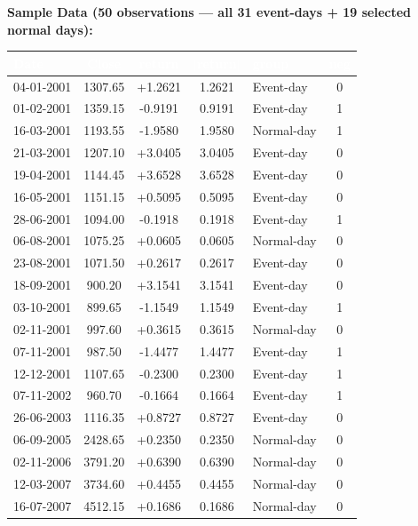 \documentclass[12pt,a4paper]{article}
\begin{document}
\textbf{Sample Data (50 observations --- all 31 event-days + 19 selected normal days):}
\begin{table}[H]
\centering
\footnotesize
\begin{tabular}{|l|c|c|c|l|c|}
\hline
\rowcolor{hdrbg}\textcolor{white}{\textbf{Date}} & \textcolor{white}{\textbf{Close}} & \textcolor{white}{\textbf{return}} & \textcolor{white}{\textbf{$|$return$|$}} & \textcolor{white}{\textbf{group}} & \textcolor{white}{\textbf{neg}} \\
\hline
04-01-2001 & 1307.65 & +1.2621 & 1.2621 & Event-day & 0 \\ \hline
01-02-2001 & 1359.15 & -0.9191 & 0.9191 & Event-day & 1 \\ \hline
16-03-2001 & 1193.55 & -1.9580 & 1.9580 & Normal-day & 1 \\ \hline
21-03-2001 & 1207.10 & +3.0405 & 3.0405 & Event-day & 0 \\ \hline
19-04-2001 & 1144.45 & +3.6528 & 3.6528 & Event-day & 0 \\ \hline
16-05-2001 & 1151.15 & +0.5095 & 0.5095 & Event-day & 0 \\ \hline
28-06-2001 & 1094.00 & -0.1918 & 0.1918 & Event-day & 1 \\ \hline
06-08-2001 & 1075.25 & +0.0605 & 0.0605 & Normal-day & 0 \\ \hline
23-08-2001 & 1071.50 & +0.2617 & 0.2617 & Event-day & 0 \\ \hline
18-09-2001 & 900.20 & +3.1541 & 3.1541 & Event-day & 0 \\ \hline
03-10-2001 & 899.65 & -1.1549 & 1.1549 & Event-day & 1 \\ \hline
02-11-2001 & 997.60 & +0.3615 & 0.3615 & Normal-day & 0 \\ \hline
07-11-2001 & 987.50 & -1.4477 & 1.4477 & Event-day & 1 \\ \hline
12-12-2001 & 1107.65 & -0.2300 & 0.2300 & Event-day & 1 \\ \hline
07-11-2002 & 960.70 & -0.1664 & 0.1664 & Event-day & 1 \\ \hline
26-06-2003 & 1116.35 & +0.8727 & 0.8727 & Event-day & 0 \\ \hline
06-09-2005 & 2428.65 & +0.2350 & 0.2350 & Normal-day & 0 \\ \hline
02-11-2006 & 3791.20 & +0.6390 & 0.6390 & Normal-day & 0 \\ \hline
12-03-2007 & 3734.60 & +0.4455 & 0.4455 & Normal-day & 0 \\ \hline
16-07-2007 & 4512.15 & +0.1686 & 0.1686 & Normal-day & 0 \\ \hline

\end{tabular}
\end{table}
\end{document}
